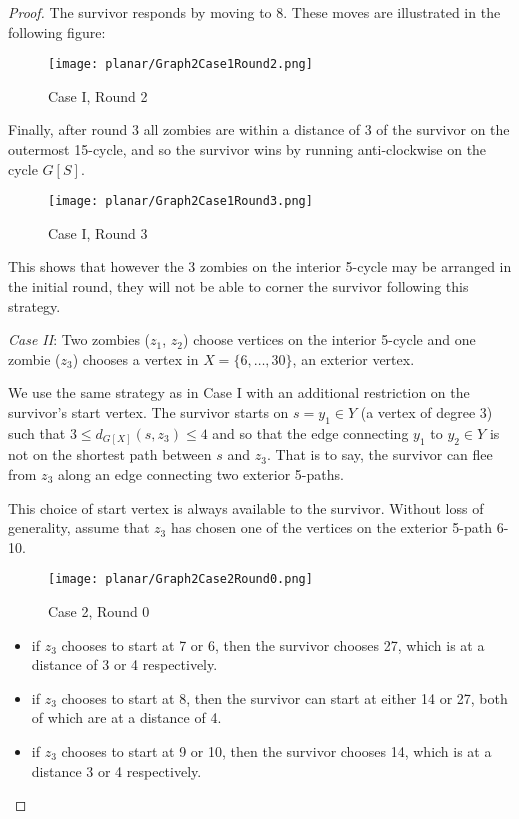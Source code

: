 \begin{proof}
The survivor responds by moving to 8. These moves are illustrated in the following figure:

\begin{figure}
\centering
\texttt{[image: planar/Graph2Case1Round2.png]}
\caption{Case I, Round 2\label{fig:planarG2C1R2}}
\end{figure}

\newpage

Finally, after round 3 all zombies are within a distance of 3 of the survivor on the outermost 15-cycle, and so the survivor wins by running anti-clockwise
on the cycle $G[S]$.

\begin{figure}
\centering
\texttt{[image: planar/Graph2Case1Round3.png]}
\caption{Case I, Round 3\label{fig:planarG2C1R3}}
\end{figure}

This shows that however the 3 zombies on the interior 5-cycle may be arranged in the initial round, they will not be able to corner the survivor following this
strategy.

\newpage

\textit{Case II}: Two zombies ($z_1$, $z_2$) choose vertices on the interior 5-cycle and one zombie ($z_3$) chooses a vertex in $X = \{ 6, \dots, 30 \}$,
an exterior vertex.

We use the same strategy as in Case I with an additional restriction on the survivor's start vertex.
The survivor starts on $s = y_1 \in Y$  (a vertex of degree 3) such that $3 \leq d_{G[X]}(s, z_3) \leq 4$ and so that the edge connecting $y_1$ to $y_2 \in Y$
is not on the shortest path between $s$ and $z_3$. That is to say, the survivor can flee from $z_3$ along an edge connecting two exterior 5-paths.

This choice of start vertex is always available to the survivor. Without loss of generality, assume that $z_3$ has chosen one of the vertices on the
exterior 5-path 6-10.

\begin{figure}
\centering
\texttt{[image: planar/Graph2Case2Round0.png]}
\caption{Case 2, Round 0\label{fig:planarG2C2R0}}
\end{figure}

\begin{itemize}
\item if $z_3$ chooses to start at 7 or 6, then the survivor chooses 27, which is at a distance of 3 or 4 respectively.
\item if $z_3$ chooses to start at 8, then the survivor can start at either 14 or 27, both of which are at a distance of 4.
\item if $z_3$ chooses to start at 9 or 10, then the survivor chooses 14, which is at a distance 3 or 4 respectively.
\end{itemize}


\end{proof}
